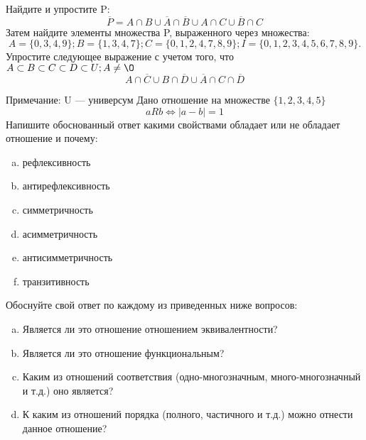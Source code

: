 \documentclass[10pt]{exam}
\begin{document}
\begin{questions}
\question
Найдите и упростите P:
\begin{equation*}
\overline{P} = A \cap B \cup \overline{A} \cap \overline{B} \cup A \cap C \cup \overline{B} \cap C
\end{equation*}
Затем найдите элементы множества P, выраженного через множества:
\begin{equation*}
A = \{0, 3, 4, 9\}; 
B = \{1, 3, 4, 7\};
C = \{0, 1, 2, 4, 7, 8, 9\};
I = \{0, 1, 2, 3, 4, 5, 6, 7, 8, 9\}.
\end{equation*}\question
Упростите следующее выражение с учетом того, что $A\subset B \subset C \subset D \subset U; A \neq \O$
\begin{equation*}
A \cap  \overline{C} \cup B \cap \overline{D} \cup  \overline{A} \cap C \cap  \overline{D}
\end{equation*}

Примечание: U — универсум\question
Дано отношение на множестве $\{1, 2, 3, 4, 5\}$ 
\begin{equation*}
aRb \iff |a-b| = 1
\end{equation*}
Напишите обоснованный ответ какими свойствами обладает или не обладает отношение и почему:   
\begin{enumerate} [a)]\setcounter{enumi}{0}
\item рефлексивность
\item антирефлексивность
\item симметричность
\item асимметричность
\item антисимметричность
\item транзитивность
\end{enumerate}

Обоснуйте свой ответ по каждому из приведенных ниже вопросов:
\begin{enumerate} [a)]\setcounter{enumi}{0}
    \item Является ли это отношение отношением эквивалентности?
    \item Является ли это отношение функциональным?
    \item Каким из отношений соответствия (одно-многозначным, много-многозначный и т.д.) оно является?
    \item К каким из отношений порядка (полного, частичного и т.д.) можно отнести данное отношение?
\end{enumerate}


\end{questions}
\end{document}
